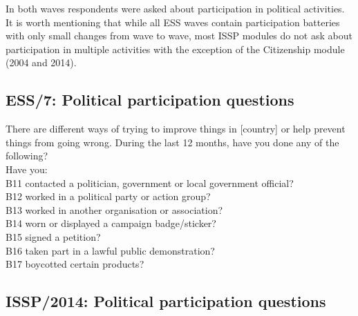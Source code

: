 \documentclass[12pt,]{article}
\begin{document}
In both waves respondents were asked about participation in political activities. It is worth mentioning that while all ESS waves contain participation batteries with only small changes from wave to wave, most ISSP modules do not ask about participation in multiple activities with the exception of the Citizenship module (2004 and 2014).

\hypertarget{ess7-political-participation-questions}{%
\subsection{ESS/7: Political participation questions}\label{ess7-political-participation-questions}}

There are different ways of trying to improve things in {[}country{]} or help prevent things from going wrong. During the last 12 months, have you done any of the following?\\
Have you:\\
B11 contacted a politician, government or local government official?\\
B12 worked in a political party or action group?\\
B13 worked in another organisation or association?\\
B14 worn or displayed a campaign badge/sticker?\\
B15 signed a petition?\\
B16 taken part in a lawful public demonstration?\\
B17 boycotted certain products?

\hypertarget{issp2014-political-participation-questions}{%
\subsection{ISSP/2014: Political participation questions}\label{issp2014-political-participation-questions}}
\end{document}
